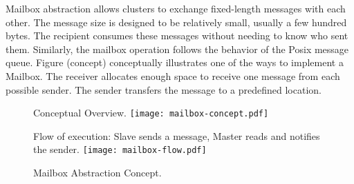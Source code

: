 
			Mailbox abstraction allows clusters to exchange fixed-length messages with each other. The message size is designed to be relatively small, usually a few hundred bytes. The recipient consumes these messages without needing to know who sent them. Similarly, the mailbox operation follows the behavior of the Posix message queue. Figure (concept) conceptually illustrates one of the ways to implement a Mailbox. The receiver allocates enough space to receive one message from each possible sender. The sender transfers the message to a predefined location.

			\begin{figure}[!tb]
				\centering%
				\caption{Mailbox Abstraction Concept.}%
				\label{fig:mailbox}%

					{Conceptual Overview.}%
					{\texttt{[image: mailbox-concept.pdf]}}%

				\hfill

					{Flow of execution: Slave sends a message, Master reads and notifies the sender.}%
					{\texttt{[image: mailbox-flow.pdf]}}%

			\end{figure}


